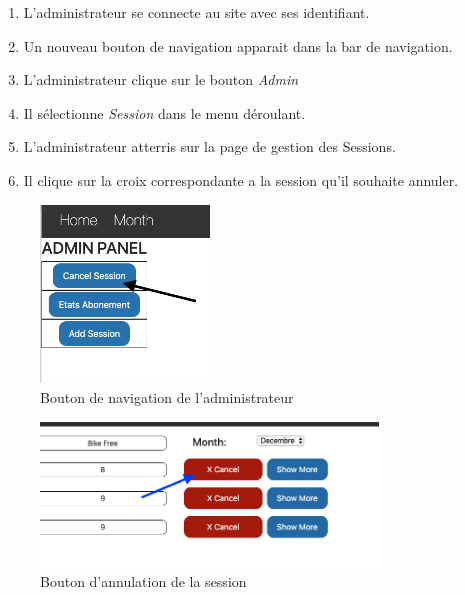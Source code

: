 \begin{enumerate}
	\item L'administrateur se connecte au site avec ses identifiant. 
	\item Un nouveau bouton de navigation apparait dans la bar de navigation. 
	\item L'administrateur clique sur le bouton \textit{Admin}
	\item Il sélectionne \textit{Session} dans le menu déroulant. 
	\item L'administrateur atterris sur la page de gestion des Sessions. 
	\item Il clique sur la croix correspondante a la session qu'il souhaite annuler. 
\end{enumerate}

\newpage
\begin{figure}[h]
	\includegraphics[width=0.4\textwidth,center]{Figures/us9-1}
	\caption{Bouton de navigation de l'administrateur}
\end{figure}

\vspace{\baselineskip}
\begin{figure}[h]
	\includegraphics[width=0.8\textwidth,center]{Figures/us9-2}
	\caption{Bouton d'annulation de la session}
\end{figure}
